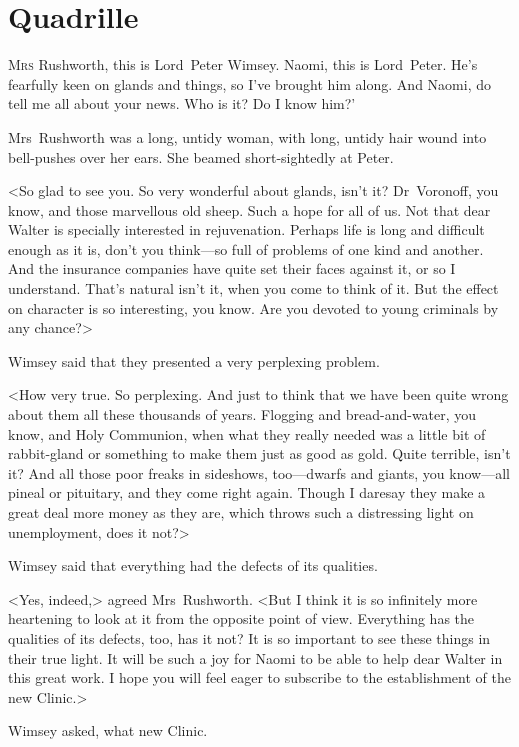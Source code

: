 \chapter{Quadrille}

\lettrine[ante=‘]{M}{rs} Rushworth, this is Lord~Peter Wimsey. Naomi, this is Lord~Peter. He's fearfully keen on glands and things, so I've brought him along. And Naomi, do tell me all about your news. Who is it? Do I know him?'

Mrs~Rushworth was a long, untidy woman, with long, untidy hair wound into bell-pushes over her ears. She beamed short-sightedly at Peter.

<So glad to see you. So very wonderful about glands, isn't it? Dr~Voronoff, you know, and those marvellous old sheep. Such a hope for all of us. Not that dear Walter is specially interested in rejuvenation. Perhaps life is long and difficult enough as it is, don't you think—so full of problems of one kind and another. And the insurance companies have quite set their faces against it, or so I understand. That's natural isn't it, when you come to think of it. But the effect on character is so interesting, you know. Are you devoted to young criminals by any chance?>

Wimsey said that they presented a very perplexing problem.

<How very true. So perplexing. And just to think that we have been quite wrong about them all these thousands of years. Flogging and bread-and-water, you know, and Holy Communion, when what they really needed was a little bit of rabbit-gland or something to make them just as good as gold. Quite terrible, isn't it? And all those poor freaks in sideshows, too—dwarfs and giants, you know—all pineal or pituitary, and they come right again. Though I daresay they make a great deal more money as they are, which throws such a distressing light on unemployment, does it not?>

Wimsey said that everything had the defects of its qualities.

<Yes, indeed,> agreed Mrs~Rushworth. <But I think it is so infinitely more heartening to look at it from the opposite point of view. Everything has the qualities of its defects, too, has it not? It is so important to see these things in their true light. It will be such a joy for Naomi to be able to help dear Walter in this great work. I hope you will feel eager to subscribe to the establishment of the new Clinic.>

Wimsey asked, what new Clinic.

